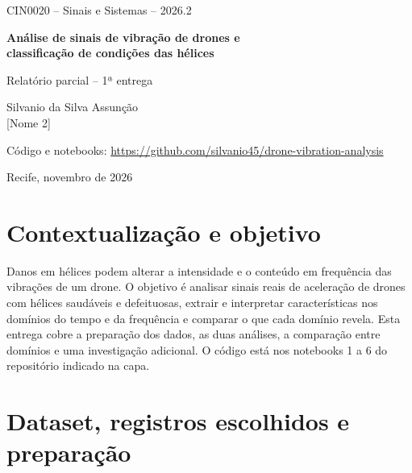 \documentclass[10pt,a4paper]{article}
\begin{document}
\begin{titlepage}
  \centering
  \vspace*{3cm}
  {\large CIN0020 -- Sinais e Sistemas -- 2026.2\par}
  \vspace{1.5cm}
  {\LARGE\bfseries Análise de sinais de vibração de drones e\\ classificação de condições das hélices\par}
  \vspace{0.8cm}
  {\Large Relatório parcial -- 1ª entrega\par}
  \vspace{2cm}
  {\large
  Silvanio da Silva Assunção\\
  [Nome 2]\\
  [Nome 3]\par}
  \vfill
  {Código e notebooks: \url{https://github.com/silvanio45/drone-vibration-analysis}\par}
  \vspace{0.5cm}
  {Recife, novembro de 2026\par}
\end{titlepage}

\section{Contextualização e objetivo}

Danos em hélices podem alterar a intensidade e o conteúdo em frequência das vibrações de um drone.
O objetivo é analisar sinais reais de aceleração de drones com hélices saudáveis e defeituosas, extrair e interpretar características nos domínios do tempo e da frequência e comparar o que cada domínio revela.
Esta entrega cobre a preparação dos dados, as duas análises, a comparação entre domínios e uma investigação adicional.
O código está nos notebooks 1 a 6 do repositório indicado na capa.

\section{Dataset, registros escolhidos e preparação}
\end{document}
